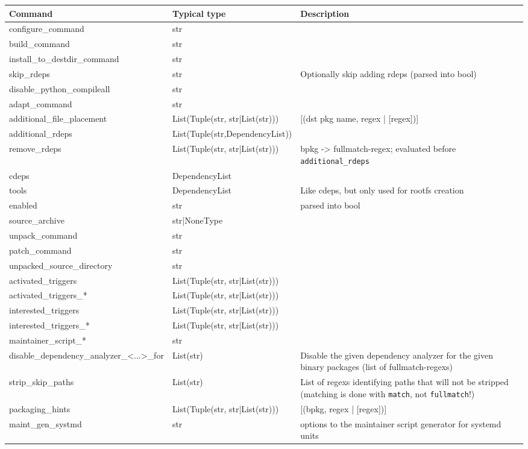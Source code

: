 \documentclass[a4paper]{scrartcl}
\begin{document}
	\begin{tabularx}{\textwidth}{llX}
		Command & Typical type & Description \\
		\hline
		configure\_command & str & \\
		build\_command & str & \\
		install\_to\_destdir\_command & str & \\
		skip\_rdeps & str & Optionally skip adding rdeps (parsed into bool) \\
		disable\_python\_compileall & str & \\
		adapt\_command & str & \\
		additional\_file\_placement & List(Tuple(str, str|List(str))) & [(dst pkg name, regex | [regex])]\\
		additional\_rdeps & List(Tuple(str,DependencyList)) & \\
		remove\_rdeps & List(Tuple(str, str|List(str))) & bpkg -> fullmatch-regex; evaluated before \texttt{additional\_rdeps} \\
		cdeps & DependencyList & \\
		tools & DependencyList&  Like cdeps, but only used for rootfs creation \\
		enabled & str & parsed into bool \\
		source\_archive & str|NoneType & \\
		unpack\_command & str & \\
		patch\_command & str & \\
		unpacked\_source\_directory & str & \\
		activated\_triggers & List(Tuple(str, str|List(str))) & \\
		activated\_triggers\_* & List(Tuple(str, str|List(str))) & \\
		interested\_triggers & List(Tuple(str, str|List(str))) & \\
		interested\_triggers\_* & List(Tuple(str, str|List(str))) & \\
		maintainer\_script\_* & str & \\
		disable\_dependency\_analyzer\_<...>\_for & List(str) & Disable the given dependency analyzer for the given binary packages (list of fullmatch-regexs) \\
		strip\_skip\_paths & List(str) & List of regexs identifying paths that will not be stripped (matching is done with \texttt{match}, not \texttt{fullmatch}!) \\
		
		packaging\_hints & List(Tuple(str, str|List(str))) & [(bpkg, regex | [regex])] \\
		maint\_gen\_systmd & str & options to the maintainer script generator for systemd units \\
	\end{tabularx}
\end{document}
